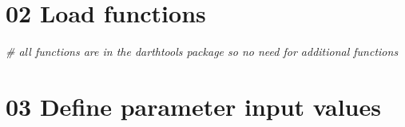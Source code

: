 \documentclass[
]{article}
\newenvironment{Shaded}{\begin{snugshade}}{\end{snugshade}}
\newcommand{\CommentTok}[1]{\textcolor[rgb]{0.56,0.35,0.01}{\textit{#1}}}
\begin{document}
\hypertarget{load-functions}{%
\section{02 Load functions}\label{load-functions}}

\begin{Shaded}
\begin{Highlighting}[]
\CommentTok{\# all functions are in the darthtools package so no need for additional functions}
\end{Highlighting}
\end{Shaded}

\hypertarget{define-parameter-input-values}{%
\section{03 Define parameter input
values}\label{define-parameter-input-values}}
\end{document}
